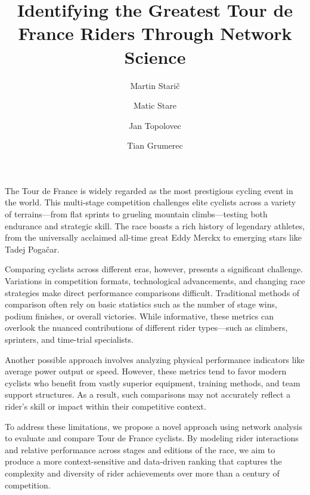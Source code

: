 \documentclass[9pt,twocolumn,twoside]{pnas-report}
\title{Identifying the Greatest Tour de France Riders Through Network Science}
\author[a,2]{Martin Starič}
\author[a,1]{Matic Stare}
\author[a]{Jan Topolovec}
\author[b]{Tian Grumerec}
\affil[a]{University of Ljubljana, Faculty of Computer and Information Science, Ve\v{c}na pot 113, SI-1000 Ljubljana, Slovenia}
\begin{document}
\maketitle
\thispagestyle{firststyle}

The Tour de France is widely regarded as the most prestigious cycling event in the world. This multi-stage competition challenges elite cyclists across a variety of terrains—from flat sprints to grueling mountain climbs—testing both endurance and strategic skill. The race boasts a rich history of legendary athletes, from the universally acclaimed all-time great Eddy Merckx to emerging stars like Tadej Pogačar. \par
Comparing cyclists across different eras, however, presents a significant challenge. Variations in competition formats, technological advancements, and changing race strategies make direct performance comparisons difficult. Traditional methods of comparison often rely on basic statistics such as the number of stage wins, podium finishes, or overall victories. While informative, these metrics can overlook the nuanced contributions of different rider types—such as climbers, sprinters, and time-trial specialists. \par
Another possible approach involves analyzing physical performance indicators like average power output or speed. However, these metrics tend to favor modern cyclists who benefit from vastly superior equipment, training methods, and team support structures. As a result, such comparisons may not accurately reflect a rider's skill or impact within their competitive context.\par
To address these limitations, we propose a novel approach using network analysis to evaluate and compare Tour de France cyclists. By modeling rider interactions and relative performance across stages and editions of the race, we aim to produce a more context-sensitive and data-driven ranking that captures the complexity and diversity of rider achievements over more than a century of competition.
\end{document}
